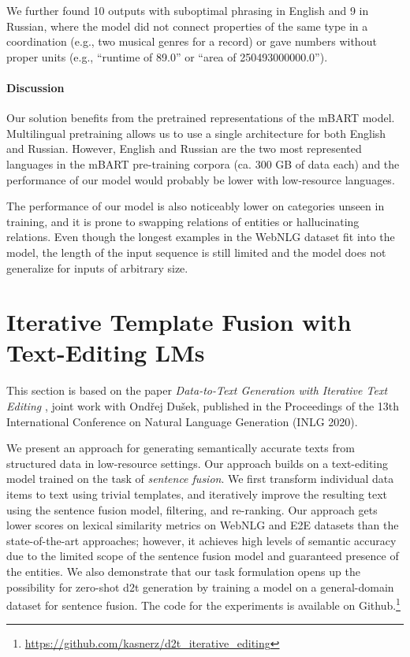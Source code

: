 We further found 10 outputs with suboptimal phrasing in English and 9 in Russian, where the model did not connect properties of the same type in a coordination (e.g., two musical genres for a record) or gave numbers without proper  units (e.g., “runtime of 89.0” or “area of 250493000000.0”).

\paragraph{Discussion}
Our solution benefits from the pretrained representations of the mBART model. Multilingual pretraining allows us to use a single architecture for both English and Russian. However, English and Russian are the two most represented languages in the mBART pre-training corpora (ca. 300 GB of data each) and the performance of our model would probably be lower with low-resource languages.

The performance of our model is also noticeably lower on categories unseen in training, and it is prone to swapping relations of entities or hallucinating relations. Even though the longest examples in the WebNLG dataset fit into the model, the length of the input sequence is still limited and the model does not generalize for inputs of arbitrary size.





\section{Iterative Template Fusion with Text-Editing LMs}
\label{sec:iterative}

\begin{refbox}
    This section is based on the paper \emph{Data-to-Text Generation with Iterative Text Editing} \cite{kasnerDatatoTextGenerationIterative2020}, joint work with Ondřej Dušek, published in the Proceedings of the 13th International Conference on Natural Language Generation (INLG 2020).
\end{refbox}

We present an approach for generating semantically accurate texts from structured data in low-resource settings. Our approach builds on a text-editing model trained on the task of \emph{sentence fusion}. We first transform individual data items to text using trivial templates, and iteratively improve the resulting text using the sentence fusion model, filtering, and re-ranking.  Our approach gets lower scores on lexical similarity metrics on WebNLG and E2E datasets than the state-of-the-art approaches; however, it achieves high levels of semantic accuracy due to the limited scope of the sentence fusion model and guaranteed presence of the entities. We also demonstrate that our task formulation opens up the possibility for zero-shot \ac{d2t} generation by training a model on a general-domain dataset for sentence fusion. The code for the experiments is available on Github.\footnote{\url{https://github.com/kasnerz/d2t_iterative_editing}}


